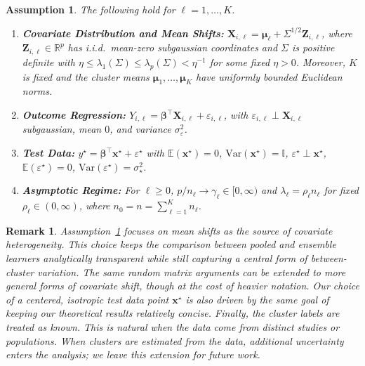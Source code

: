 \documentclass{article}
\theoremstyle{plain}
\newtheorem{remark}[theorem]{Remark}
\newtheorem{assumption}[theorem]{Assumption}
\theoremstyle{remark}
\def \bbeta{\boldsymbol{\beta}}
\def \bx{\mathbf{x}}
\def \bbeta{\boldsymbol{\beta}}
\def \bX{\mathbf{X}}
\def \E{\mathbb{E}}
\def \bmu{\pmb{\mu}}
\def \bX{\boldsymbol{X}}
\begin{document}
\begin{assumption}\label{assumptions} The following hold for $\ell=1,\ldots,K$.
\begin{enumerate}
\item[(i)] \textbf{Covariate Distribution and Mean Shifts:} $\bX_{i,\ell}=\bmu_\ell+\Sigma^{1/2}\mathbf{Z}_{i,\ell}$, where $\mathbf{Z}_{i,\ell}\in\mathbb{R}^p$ has i.i.d.\ mean-zero subgaussian coordinates and $\Sigma$ is positive definite with $\eta\le\lambda_1(\Sigma)\le\lambda_p(\Sigma)<\eta^{-1}$ for some fixed $\eta>0$. Moreover, $K$ is fixed and the cluster means $\bmu_1,\ldots,\bmu_K$ have uniformly bounded Euclidean norms.

\item[(ii)] \textbf{Outcome Regression:} $Y_{i,\ell}=\boldsymbol{\beta}^\top\bX_{i,\ell}+\varepsilon_{i,\ell}$, with $\varepsilon_{i,\ell}\perp\bX_{i,\ell}$ subgaussian, mean $0$, and variance $\sigma_\varepsilon^2$.

\item[(iii)] \textbf{Test Data:} $y^\star=\bbeta^\top\bx^\star+\varepsilon^\star$ with $\E(\bx^\star)=0$, $\mathrm{Var}(\bx^\star)=\mathbb{I}$, $\varepsilon^\star\perp\bx^\star$, $\E(\varepsilon^\star)=0$, $\mathrm{Var}(\varepsilon^\star)=\sigma_\star^2$.

\item[(iv)] \textbf{Asymptotic Regime:} For $\ell\ge 0$, $p/n_\ell\to\gamma_\ell\in[0,\infty)$ and $\lambda_\ell=\rho_\ell n_\ell$ for fixed $\rho_\ell\in(0,\infty)$, where $n_0=n=\sum_{\ell=1}^K n_\ell$.
\end{enumerate}
\end{assumption}

\begin{remark}
Assumption~\ref{assumptions} focuses on mean shifts as the source of covariate heterogeneity. This choice keeps the comparison between pooled and ensemble learners analytically transparent while still capturing a central form of between-cluster variation. The same random matrix arguments can be extended to more general forms of covariate shift, though at the cost of heavier notation.
 Our choice of a centered, isotropic test data point $\bx^\star$ is also driven by the same goal of keeping our theoretical results relatively concise. Finally, the cluster labels are treated as known. This is natural when the data come from distinct studies or populations. When clusters are estimated from the data, additional uncertainty enters the analysis; we leave this extension for future work.
\end{remark}
\end{document}
